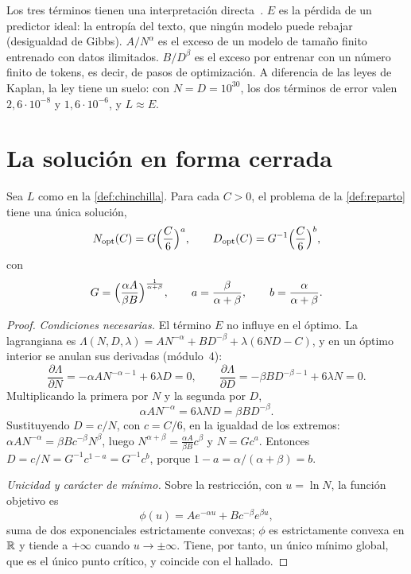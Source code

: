 Los tres términos tienen una interpretación directa~\cite[§3.3]{hoffmann}. $E$ es la pérdida de un predictor ideal: la entropía del texto, que ningún modelo puede rebajar (desigualdad de Gibbs). $A/N^{\alpha}$ es el exceso de un modelo de tamaño finito entrenado con datos ilimitados. $B/D^{\beta}$ es el exceso por entrenar con un número finito de tokens, es decir, de pasos de optimización. A diferencia de las leyes de Kaplan, la ley tiene un suelo: con $N=D=10^{30}$, los dos términos de error valen $2{,}6\cdot 10^{-8}$ y $1{,}6\cdot 10^{-6}$, y $L\approx E$.

\section{La solución en forma cerrada}

\begin{teorema}\label{teo:chinchilla}
Sea $L$ como en la \cref{def:chinchilla}. Para cada $C>0$, el problema de la \cref{def:reparto} tiene una única solución,
\[
N_{\mathrm{opt}}(C)=G\Bigl(\frac{C}{6}\Bigr)^{a},\qquad D_{\mathrm{opt}}(C)=G^{-1}\Bigl(\frac{C}{6}\Bigr)^{b},
\]
con
\[
G=\Bigl(\frac{\alpha A}{\beta B}\Bigr)^{\frac{1}{\alpha+\beta}},\qquad a=\frac{\beta}{\alpha+\beta},\qquad b=\frac{\alpha}{\alpha+\beta}.
\]
\end{teorema}

\begin{proof}
\emph{Condiciones necesarias.} El término $E$ no influye en el óptimo. La lagrangiana es $\Lambda(N,D,\lambda)=AN^{-\alpha}+BD^{-\beta}+\lambda(6ND-C)$, y en un óptimo interior se anulan sus derivadas (módulo~4):
\[
\frac{\partial\Lambda}{\partial N}=-\alpha AN^{-\alpha-1}+6\lambda D=0,\qquad
\frac{\partial\Lambda}{\partial D}=-\beta BD^{-\beta-1}+6\lambda N=0.
\]
Multiplicando la primera por $N$ y la segunda por $D$,
\begin{equation}\label{eq:equilibrio}
\alpha AN^{-\alpha}=6\lambda ND=\beta BD^{-\beta}.
\end{equation}
Sustituyendo $D=c/N$, con $c=C/6$, en la igualdad de los extremos: $\alpha AN^{-\alpha}=\beta Bc^{-\beta}N^{\beta}$, luego $N^{\alpha+\beta}=\frac{\alpha A}{\beta B}c^{\beta}$ y $N=Gc^{a}$. Entonces $D=c/N=G^{-1}c^{1-a}=G^{-1}c^{b}$, porque $1-a=\alpha/(\alpha+\beta)=b$.

\emph{Unicidad y carácter de mínimo.} Sobre la restricción, con $u=\ln N$, la función objetivo es
\[
\phi(u)=Ae^{-\alpha u}+Bc^{-\beta}e^{\beta u},
\]
suma de dos exponenciales estrictamente convexas; $\phi$ es estrictamente convexa en $\mathbb{R}$ y tiende a $+\infty$ cuando $u\to\pm\infty$. Tiene, por tanto, un único mínimo global, que es el único punto crítico, y coincide con el hallado.
\end{proof}

